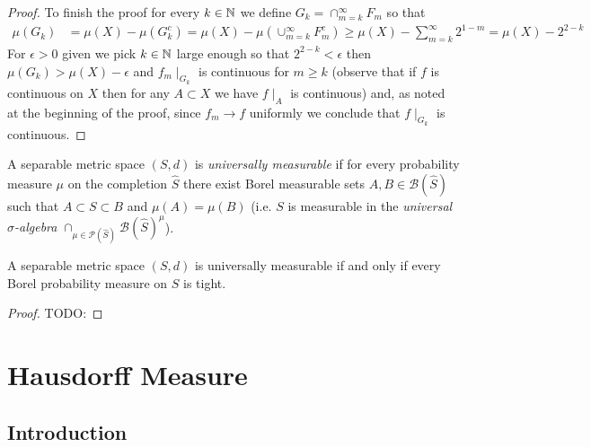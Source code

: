 \begin{proof}
To finish the proof for every $k \in \mathbb{N}$ we define $G_k = \cap_{m=k}^\infty F_m$ so that 
\begin{align*}
\mu(G_k) &= \mu(X) - \mu(G_k^c) = \mu(X) - \mu\left( \cup_{m=k}^\infty F^c_m \right) \geq \mu(X) - \sum_{m=k}^\infty 2^{1-m} = \mu(X) - 2^{2 - k}
\end{align*}
For $\epsilon > 0$ given we pick $k \in \mathbb{N}$ large enough so that $2^{2-k} < \epsilon$ then $\mu(G_k) > \mu(X) - \epsilon$ and $f_m\mid_{G_k}$ is continuous for $m \geq k$  (observe that if $f$ is continuous on $X$ then for any $A \subset X$ we have $f\mid_A$ is continuous) and, as noted at the beginning of the proof, since $f_m \to f$ uniformly we conclude that $f \mid_{G_k}$ is continuous. 
\end{proof}

\begin{defn}A separable metric space $(S,d)$ is \emph{universally measurable} if for every probability measure $\mu$ on the completion $\hat{S}$ there exist Borel measurable sets $A, B \in \mathcal{B}(\hat{S})$ such that $A \subset S \subset B$ and $\mu(A) = \mu(B)$ (i.e. $S$ is measurable in the \emph{universal $\sigma$-algebra} $\cap_{\mu \in \mathcal{P}(\hat{S})} \mathcal{B}(\hat{S})^{\mu}$).
\end{defn}

\begin{thm}\label{UniversalMeasurabilityAndTightness}A separable metric space $(S,d)$ is universally measurable if and only if every Borel probability measure on $S$ is tight.
\end{thm}
\begin{proof}
TODO:  
\end{proof}

\section{Hausdorff Measure}

\subsection{Introduction}

